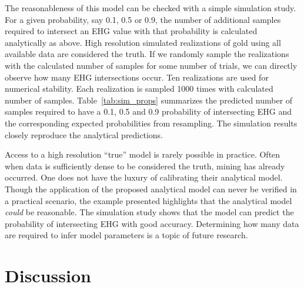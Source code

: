 The reasonableness of this model can be checked with a simple simulation study. For a given probability, say 0.1, 0.5 or 0.9, the number of additional samples required to intersect an EHG value with that probability is calculated analytically as above. High resolution simulated realizations of gold using all available data are considered the truth. If we randomly sample the realizations with the calculated number of samples for some number of trials, we can directly observe how many EHG intersections occur. Ten realizations are used for numerical stability. Each realization is sampled 1000 times with calculated number of samples. Table~\ref{tab:sim_props} summarizes the predicted number of samples required to have a 0.1, 0.5 and 0.9 probability of intersecting EHG and the corresponding expected probabilities from resampling. The simulation results closely reproduce the analytical predictions.



Access to a high resolution ``true'' model is rarely possible in practice. Often when data is sufficiently dense to be considered the truth, mining has already occurred. One does not have the luxury of calibrating their analytical model. Though the application of the proposed analytical model can never be verified in a practical scenario, the example presented highlights that the analytical model \emph{could} be reasonable. The simulation study shows that the model can predict the probability of intersecting EHG with good accuracy. Determining how many data are required to infer model parameters is a topic of future research.

\FloatBarrier
\section{Discussion}
\label{sec:discuss04}
